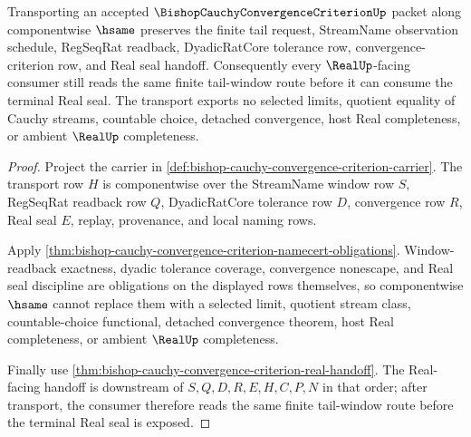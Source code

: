 \begin{theorem}
\label{thm:bishop-cauchy-convergence-criterion-tail-stability}
Transporting an accepted $\BishopCauchyConvergenceCriterionUp$ packet along componentwise $\hsame$ preserves the finite tail request, StreamName observation schedule, RegSeqRat readback, DyadicRatCore tolerance row, convergence-criterion row, and Real seal handoff. Consequently every $\RealUp$-facing consumer still reads the same finite tail-window route before it can consume the terminal Real seal. The transport exports no selected limits, quotient equality of Cauchy streams, countable choice, detached convergence, host Real completeness, or ambient $\RealUp$ completeness.
\end{theorem}
\begin{proof}
Project the carrier in \autoref{def:bishop-cauchy-convergence-criterion-carrier}. The transport row $H$ is componentwise over the StreamName window row $S$, RegSeqRat readback row $Q$, DyadicRatCore tolerance row $D$, convergence row $R$, Real seal $E$, replay, provenance, and local naming rows.

Apply \autoref{thm:bishop-cauchy-convergence-criterion-namecert-obligations}. Window-readback exactness, dyadic tolerance coverage, convergence nonescape, and Real seal discipline are obligations on the displayed rows themselves, so componentwise $\hsame$ cannot replace them with a selected limit, quotient stream class, countable-choice functional, detached convergence theorem, host Real completeness, or ambient $\RealUp$ completeness.

Finally use \autoref{thm:bishop-cauchy-convergence-criterion-real-handoff}. The Real-facing handoff is downstream of $S,Q,D,R,E,H,C,P,N$ in that order; after transport, the consumer therefore reads the same finite tail-window route before the terminal Real seal is exposed.
\end{proof}


